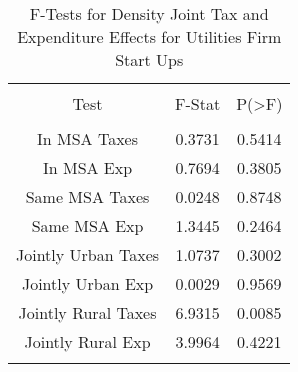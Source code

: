 
\begin{table}[!htbp] \centering 
  \caption{F-Tests for Density Joint Tax and Expenditure Effects for Utilities Firm Start Ups} 
  \label{22Ftests} 
\begin{tabular}{@{\extracolsep{5pt}} ccc} 
\\[-1.8ex]\hline 
\hline \\[-1.8ex] 
Test & F-Stat & P(\textgreater F) \\ 
\hline \\[-1.8ex] 
In MSA Taxes & 0.3731 & 0.5414 \\ 
In MSA Exp & 0.7694 & 0.3805 \\ 
Same MSA Taxes & 0.0248 & 0.8748 \\ 
Same MSA Exp & 1.3445 & 0.2464 \\ 
Jointly Urban Taxes & 1.0737 & 0.3002 \\ 
Jointly Urban Exp & 0.0029 & 0.9569 \\ 
Jointly Rural Taxes & 6.9315 & 0.0085 \\ 
Jointly Rural Exp & 3.9964 & 0.4221 \\ 
\hline \\[-1.8ex] 
\end{tabular} 
\end{table} 
